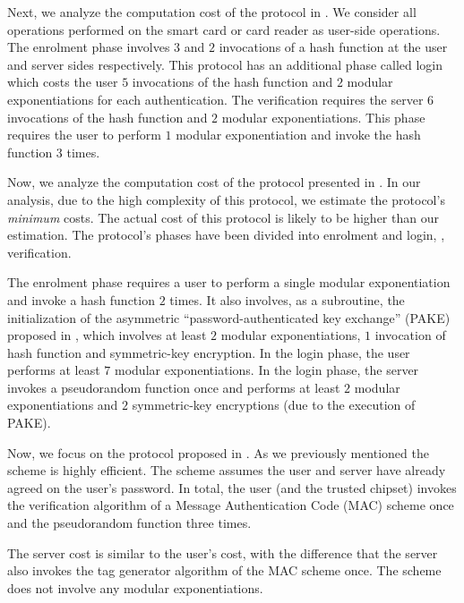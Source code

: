 Next, we analyze the computation cost of the protocol in \cite{WangW18}. We consider all operations performed on the smart card or card reader as user-side operations. The enrolment phase involves $3$ and $2$ invocations of a hash function at the user and server sides respectively. This protocol has an additional phase called login which costs the user  $5$ invocations of the hash function and $2$ modular exponentiations for each authentication.  The verification requires the server $6$ invocations of the hash function and $2$ modular exponentiations. This phase requires the user to perform $1$ modular exponentiation and invoke the hash function $3$ times. 


Now, we analyze the computation cost of the protocol presented in \cite{JareckiJKSS21}. In our analysis, due to the high complexity of this protocol, we estimate the protocol's \emph{minimum} costs. The actual cost of this protocol is likely to be higher than our estimation. The protocol's phases have been divided into enrolment and login, \ie, verification. 

The enrolment phase requires a user to perform a single modular exponentiation and invoke a hash function $2$ times. It also involves, as a subroutine, the initialization of the asymmetric  ``password-authenticated key exchange'' (PAKE) proposed in \cite{GentryMR06}, which involves at least $2$ modular exponentiations, $1$ invocation of hash function and symmetric-key encryption. In the login phase, the user performs at least $7$ modular exponentiations. In the login phase, the server invokes a pseudorandom function once and performs at least $2$ modular exponentiations and $2$ symmetric-key encryptions (due to the execution of PAKE). 

Now, we focus on the protocol proposed in \cite{MatsuoMY11}. As we previously mentioned the scheme is highly efficient. The scheme assumes the user and server have already agreed on the user's password. 
%
In total, the user (and the trusted chipset) invokes the verification algorithm of a Message Authentication Code (MAC) scheme once and the pseudorandom function three times. 

The server cost is similar to the user's cost, with the difference that the server also invokes the tag generator algorithm of the MAC scheme once. The scheme does not involve any modular exponentiations. 

